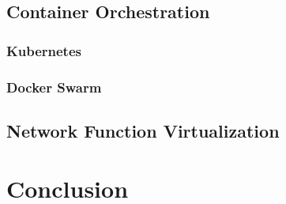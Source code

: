 \subsection{Container Orchestration}

\subsubsection{Kubernetes}

\subsubsection{Docker Swarm}


\subsection{Network Function Virtualization}


\section{Conclusion}
